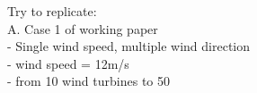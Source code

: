 Try to replicate:\\
A. Case 1 of working paper \\
- Single wind speed, multiple wind direction\\
- wind speed = 12m/s\\
- from 10 wind turbines to 50\\
